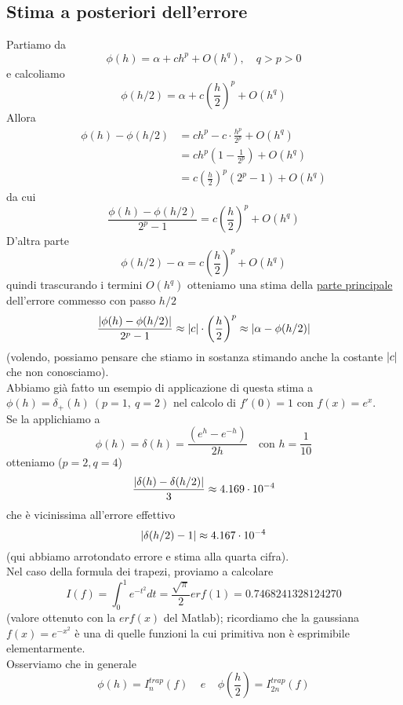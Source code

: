 \documentclass[12pt,a4paper]{article}
\DeclarePairedDelimiter{\abs}{\lvert}{\rvert}
\begin{document}
\subsection{Stima a posteriori dell'errore}
Partiamo da
\[
\phi (h) = \alpha + ch^p + O(h^q), \quad q>p>0
\]
e calcoliamo
\[
\phi (h/2) = \alpha + c\left(\frac{h}{2}\right)^p + O(h^q)
\]
Allora
\[
\begin{split}
\phi (h) - \phi (h/2) & = ch^p - c \cdot \frac{h^p}{2^p} + O(h^q) \\
& = ch^p \left(1 - \frac{1}{2^p}\right) + O(h^q) \\
& = c\left(\frac{h}{2}\right)^p (2^p-1) + O(h^q)
\end{split}
\]
da cui
\[
\frac{\phi (h) - \phi (h/2)}{2^p - 1} = c\left(\frac{h}{2}\right)^p + O(h^q)
\]
D'altra parte
\[
\phi (h/2) - \alpha = c\left(\frac{h}{2}\right)^p + O(h^q)
\]
quindi trascurando i termini $O(h^q)$ otteniamo una stima della \uline{parte principale} dell'errore commesso con passo $h/2$
\[
\frac{\abs{\phi (h) - \phi (h/2)}}{2^p-1} \approx \abs{c} \cdot \left(\frac{h}{2}\right)^p \approx \abs{\alpha - \phi (h/2)}
\]
(volendo, possiamo pensare che stiamo in sostanza stimando anche la costante $\abs{c}$ che non conosciamo).\\
Abbiamo già fatto un esempio
di applicazione di questa stima a $\phi (h) = \delta_+ (h) \ (p=1, \ q=2)$ nel calcolo di $f'(0) = 1$ con $f(x) = e^x$.\\
Se la applichiamo a
\[
\phi (h) = \delta (h) = \frac{(e^h - e^{-h})}{2h} \quad \text{con } h=\frac{1}{10}
\]
otteniamo ($p=2, q=4$)
\[
\frac{\abs{\delta (h) - \delta (h/2)}}{3} \approx 4.169 \cdot 10^{-4}
\]
che è vicinissima all'errore effettivo
\[
\abs{\delta (h/2) - 1} \approx 4.167 \cdot 10^{-4}
\]
(qui abbiamo arrotondato errore e stima alla quarta cifra).\\
Nel caso della formula dei trapezi, proviamo a calcolare 
\begin{equation*}
    I(f)=\int_0^1e^{-t^2}dt=\frac{\sqrt{\pi}}{2}erf(1)=0.7468241328124270
\end{equation*}
(valore ottenuto con la $erf(x)$ del Matlab); ricordiamo che la gaussiana $f(x)=e^{-x^2}$ è una di quelle funzioni la cui primitiva non è esprimibile elementarmente.\\Osserviamo che in generale 
\begin{equation*}
    \phi(h)=I_n^{trap}(f)\  \  \  \  \ e \  \  \  \  \ \phi\left(\frac{h}{2}\right)=I_{2n}^{trap}(f)
\end{equation*}
\end{document}
